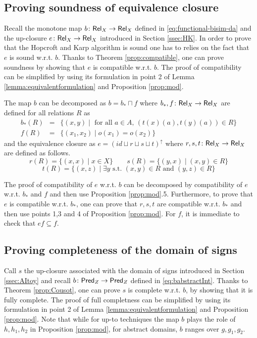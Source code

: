 \documentclass{llncs}
\begin{document}
 
 \subsection{Proving soundness of equivalence closure}\label{sec:HKsoundness}
 Recall the monotone map $b\colon \mathsf{Rel}_X \to \mathsf{Rel}_X$ defined in \eqref{eq:functional-bisim-da} and the up-closure $e\colon \mathsf{Rel}_X \to \mathsf{Rel}_X$ introduced in Section \ref{ssec:HK}.
 In order to prove that the Hopcroft and Karp algorithm is sound one has to relies on the fact that $e$ is sound w.r.t. $b$. 
 Thanks to Theorem \ref{prop:compatible}, one can prove soundness by showing that $e$ is compatible w.r.t. $b$. The proof of compatibility can be simplified by using its formulation in point 2 of Lemma \ref{lemma:equivalentformulation} and Proposition \ref{prop:mod}.

The map $b$ can be decomposed as $b = b_* \sqcap f$ where $b_*,f \colon \mathsf{Rel}_X\to  \mathsf{Rel}_X$ are defined for all relations $R$ as
\begin{equation}
\begin{array}{rcl}
b_*(R) & =& \{(x,y) \mid \text{ for all } a\in A, \, (t(x)(a), t(y)(a))\in R  \} \\ 
f(R) & = & \{(x_1,x_2)  \mid o(x_1)=o(x_2) \}
\end{array}
\end{equation}
and the equivalence closure as $e= (id\sqcup r \sqcup s \sqcup t )^\uparrow$ where 
$r,s,t\colon \mathsf{Rel}_X \to \mathsf{Rel}_X$ are defined as follows.
$$r(R) = \{(x,x)\mid x\in X \} \qquad s(R)=\{(y,x)\mid (x,y)\in R\}$$ 
$$t(R)=\{(x,z) \mid \exists y \text{ s.t. } (x,y) \in R \text{ and } (y,z)\in R\} $$

The proof of  compatibility of $e$ w.r.t. $b$ can be decomposed by compatibility of $e$ w.r.t. $b_*$ and $f$ and then use Proposition  \ref{prop:mod}.5. Furthermore, to prove that $e$ is compatible w.r.t. $b_*$, one can prove that $r,s,t$ are compatible w.r.t. $b_*$ and then use points 1,3 and 4 of Proposition  \ref{prop:mod}. For $f$, it is immediate to check that $ef\subseteq f$. 

\subsection{Proving completeness of the domain of signs}
Call $s$ the up-closure associated with the domain of signs introduced in Section \ref{ssec:AItoy} and recall $b\colon \mathsf{Pred}_Z \to \mathsf{Pred}_Z$ defined in \eqref{eq:babstractInt}. Thanks to Theorem \ref{prop:Cousot}, one can prove $s$ is complete w.r.t. $b$, by showing that it is fully complete. The proof of full completness can be simplified by using its formulation in point 2 of Lemma \ref{lemma:equivalentformulation} and Proposition \ref{prop:mod}. Note that while for up-to techniques the map $b$ plays the role of $h,h_1,h_2$ in Proposition \ref{prop:mod}, for abstract domains, $b$ ranges over $g,g_1,g_2$.
\end{document}
